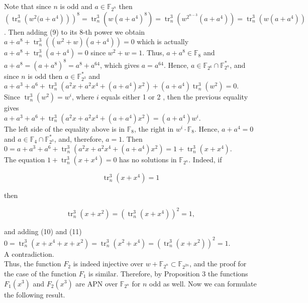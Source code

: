 \documentclass[10pt]{article}
\begin{document}
Note that since $n$ is odd and $a \in \mathbb{F}_{2^{n}}$ then $\left(\operatorname{tr}_{n}^{3}\left(w^{2}(a+\right.\right. \left.\left.\left.a^{4}\right)\right)\right)^{8}=\operatorname{tr}_{n}^{3}\left(w\left(a+a^{4}\right)^{8}\right)=\operatorname{tr}_{n}^{3}\left(w^{2^{n-3}}\left(a+a^{4}\right)\right)= \operatorname{tr}_{n}^{3}\left(w\left(a+a^{4}\right)\right)$. Then adding (9) to its 8-th power we obtain $a+a^{8}+\operatorname{tr}_{n}^{3}\left(\left(w^{2}+w\right)\left(a+a^{4}\right)\right)=0$ which is actually $a+a^{8}+\operatorname{tr}_{n}^{3}\left(a+a^{4}\right)=0$ since $w^{2}+w=1$. Thus, $a+a^{8} \in \mathbb{F}_{8}$ and $a+a^{8}=\left(a+a^{8}\right)^{8}=a^{8}+a^{64}$, which gives $a=a^{64}$. Hence, $a \in \mathbb{F}_{2^{6}} \cap \mathbb{F}_{2^{n}}^{*}$, and since $n$ is odd then $a \in \mathbb{F}_{2^{3}}^{*}$ and $a+a^{3}+a^{6}+\operatorname{tr}_{n}^{3}\left(a^{2} x+a^{2} x^{4}+\left(a+a^{4}\right) x^{2}\right)+\left(a+a^{4}\right) \operatorname{tr}_{n}^{3}\left(w^{2}\right)=0$.\\
Since $\operatorname{tr}_{n}^{3}\left(w^{2}\right)=w^{i}$, where $i$ equals either 1 or 2 , then the previous equality gives\\
$a+a^{3}+a^{6}+\operatorname{tr}_{n}^{3}\left(a^{2} x+a^{2} x^{4}+\left(a+a^{4}\right) x^{2}\right)=\left(a+a^{4}\right) w^{i}$.\\
The left side of the equality above is in $\mathbb{F}_{8}$, the right in $w^{i} \cdot \mathbb{F}_{8}$. Hence, $a+a^{4}=0$ and $a \in \mathbb{F}_{4} \cap \mathbb{F}_{2^{3}}^{*}$, and, therefore, $a=1$. Then\\
$0=a+a^{3}+a^{6}+\operatorname{tr}_{n}^{3}\left(a^{2} x+a^{2} x^{4}+\left(a+a^{4}\right) x^{2}\right)=1+\operatorname{tr}_{n}^{3}\left(x+x^{4}\right)$.\\
The equation $1+\operatorname{tr}_{n}^{3}\left(x+x^{4}\right)=0$ has no solutions in $\mathbb{F}_{2^{n}}$. Indeed, if


\begin{equation*}
\operatorname{tr}_{n}^{3}\left(x+x^{4}\right)=1 \tag{10}
\end{equation*}


then


\begin{equation*}
\operatorname{tr}_{n}^{3}\left(x+x^{2}\right)=\left(\operatorname{tr}_{n}^{3}\left(x+x^{4}\right)\right)^{2}=1, \tag{11}
\end{equation*}


and adding (10) and (11)\\
$0=\operatorname{tr}_{n}^{3}\left(x+x^{4}+x+x^{2}\right)=\operatorname{tr}_{n}^{3}\left(x^{2}+x^{4}\right)=\left(\operatorname{tr}_{n}^{3}\left(x+x^{2}\right)\right)^{2}=1$.\\
A contradiction.\\
Thus, the function $F_{2}$ is indeed injective over $w+\mathbb{F}_{2^{n}} \subset \mathbb{F}_{2^{2 n}}$, and the proof for the case of the function $F_{1}$ is similar. Therefore, by Proposition 3 the functions $F_{1}\left(x^{3}\right)$ and $F_{2}\left(x^{3}\right)$ are APN over $\mathbb{F}_{2^{n}}$ for $n$ odd as well. Now we can formulate the following result.
\end{document}
